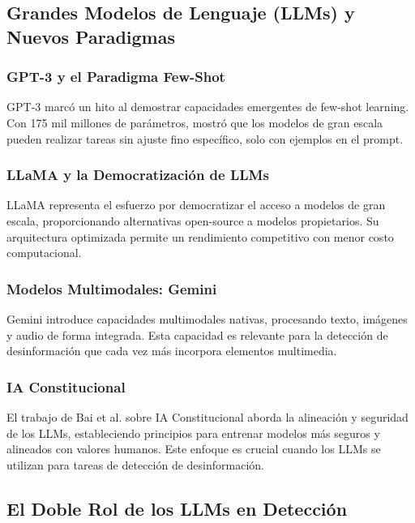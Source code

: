 \subsection{Grandes Modelos de Lenguaje (LLMs) y Nuevos Paradigmas}

\subsubsection{GPT-3 y el Paradigma Few-Shot}

GPT-3 \cite{brown2020language} marcó un hito al demostrar capacidades emergentes de few-shot learning. Con 175 mil millones de parámetros, mostró que los modelos de gran escala pueden realizar tareas sin ajuste fino específico, solo con ejemplos en el prompt.

\subsubsection{LLaMA y la Democratización de LLMs}

LLaMA \cite{touvron2023llama} representa el esfuerzo por democratizar el acceso a modelos de gran escala, proporcionando alternativas open-source a modelos propietarios. Su arquitectura optimizada permite un rendimiento competitivo con menor costo computacional.

\subsubsection{Modelos Multimodales: Gemini}

Gemini \cite{gemini2023family} introduce capacidades multimodales nativas, procesando texto, imágenes y audio de forma integrada. Esta capacidad es relevante para la detección de desinformación que cada vez más incorpora elementos multimedia.

\subsubsection{IA Constitucional}

El trabajo de Bai et al. \cite{bai2022constitutional} sobre IA Constitucional aborda la alineación y seguridad de los LLMs, estableciendo principios para entrenar modelos más seguros y alineados con valores humanos. Este enfoque es crucial cuando los LLMs se utilizan para tareas de detección de desinformación.

\subsection{El Doble Rol de los LLMs en Detección}


